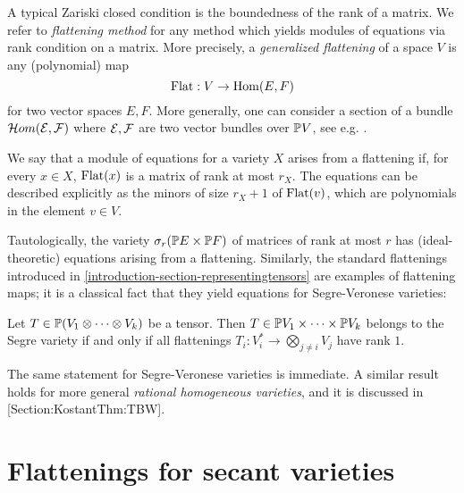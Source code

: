 A typical Zariski closed condition is the boundedness of the rank of a matrix. We refer to \emph{flattening method} for any method which yields modules of equations via rank condition on a matrix. More precisely, a \emph{generalized flattening} of a space $V$ is any (polynomial) map 
\[
\mathrm{Flat} : V \to \operatorname{Hom} ( E,F)
\]
for two vector spaces $E,F$. More generally, one can consider a section of a bundle $\mathcal{H}om(\mathcal{E},\mathcal{F})$ where $\mathcal{E},\mathcal{F}$ are two vector bundles over $\mathbb{P} V$, see e.g. \cite{EH88}.

We say that a module of equations for a variety $X$ arises from a flattening if, for every $x \in X$, $\mathrm{Flat}(x)$ is a matrix of rank at most $r_X$. The equations can be described explicitly as the minors of size $r_X+1$ of $\mathrm{Flat}(v)$, which are polynomials in the element $v \in V$.

Tautologically, the variety $\sigma_r( \mathbb{P} E \times \mathbb{P} F)$ of matrices of rank at most $r$ has (ideal-theoretic) equations arising from a flattening. Similarly, the standard flattenings introduced in \ref{introduction-section-representingtensors} are examples of flattening maps; it is a classical fact that they yield equations for Segre-Veronese varieties:
\begin{proposition}
 \label{flattenings-proposition-standardFlatrank1}
 Let $T \in \mathbb{P} (V_1 \otimes \cdots \otimes V_k)$ be a tensor. Then $T \in \mathbb{P} V_1 \times \cdots \times \mathbb{P} V_k$ belongs to the Segre variety if and only if all flattenings $T_i : V_i^* \to \bigotimes _{j \neq i} V_j$ have rank $1$.
\end{proposition}
The same statement for Segre-Veronese varieties is immediate. A similar result holds for more general \emph{rational homogeneous varieties}, and it is discussed in [Section:KostantThm:TBW].

\section{Flattenings for secant varieties}
\label{RepTheory-section-flatteningsSecants}

